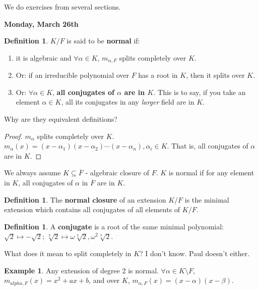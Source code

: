 \documentclass[9pt,reqno,twoside]{amsbook}
\theoremstyle{plain}
\numberwithin{section}{chapter}
\numberwithin{equation}{chapter}
\theoremstyle{definition}
\newtheorem{Def}[theorem]{Definition}
\newtheorem{Ex}[theorem]{Example}
\theoremstyle{remark}
\theoremstyle{plain}
\newcommand{\sub}{\subseteq}
\newcommand{\bb}{\vspace{3mm}}
\renewcommand{\bar}{\overline}%
\begin{document}
We do exercises from several sections.  


\bb

\textbf{Monday, March 26th}

\begin{Def} 
$K/F$ is said to be \textbf{normal} if:
\begin{enumerate}
\item it is algebraic and $\forall \alpha \in K$, $m_{\alpha,F}$ splits completely over $K$.
\item Or: if an irreducible polynomial over $F$ has a root in $K$, then it splits over $K$. 
\item Or: $\forall \alpha \in K$, \textbf{all conjugates of $\alpha$ are in $K$}. This is to say, if you take an element $\alpha \in K$, all its conjugates in any \textit{larger} field are in $K$. 
\end{enumerate}  
\end{Def} 

Why are they equivalent definitions? 
\begin{proof}
$m_{\alpha}$ splits completely over $K$. $m_{\alpha}(x) = (x - \alpha_1)(x - \alpha_2)\cdots(x - \alpha_n), \alpha_i \in K$. That is, all conjugates of $\alpha$ are in $K$. 
\end{proof}

We always assume $K \sub \bar{F}$ - algebraic closure of $F$. $K$ is normal if for any element in $K$, all conjugates of $\alpha$ in $\bar{F}$ are in $K$. 

\begin{Def}
The \textbf{normal closure} of an extension $K/F$ is the minimal extension which contains all conjugates of all elements of $K/F$. 
\end{Def}

\begin{Def}
A \textbf{conjugate} is a root of the same minimal polynomial: $\sqrt{2}\mapsto -\sqrt{2}$; $\sqrt[3]{2} \mapsto \omega\sqrt[3]{2},\omega^2\sqrt[3]{2}$. 
\end{Def}

What does it mean to split completely in $K$? I don't know. Paul doesn't either. 

\begin{Ex}
Any extension of degree 2 is normal. $\forall \alpha \in K\setminus F$, $m_{alpha,F}(x) = x^2 + ax + b$, and over $K$, $m_{\alpha,F}(x) = (x - \alpha)(x - \beta)$. 
\end{Ex}
\end{document}
